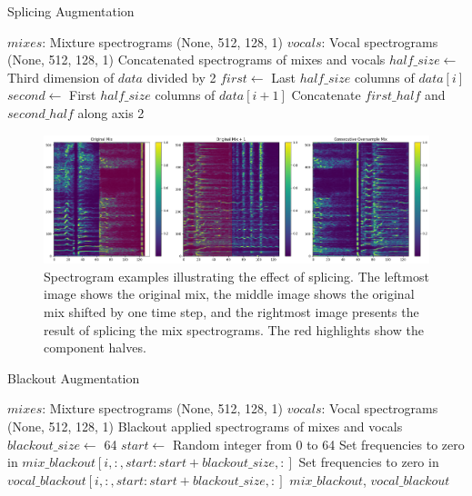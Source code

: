 \documentclass[conference]{IEEEtran}
\begin{document}
\begin{algorithm}[!htb]
\caption{Splicing Augmentation}
\label{alg:splicing}
\begin{algorithmic}[1] %
\Require $mixes$:  Mixture spectrograms (None, 512, 128, 1)
\Require $vocals$: Vocal spectrograms (None, 512, 128, 1)
\Ensure Concatenated spectrograms of mixes and vocals
\newline
{}
    \State $half\_size \gets$ Third dimension of $data$ divided by 2
        \State $first \gets$ Last $half\_size$ columns of $data[i]$
        \State $second \gets$ First $half\_size$ columns of $data[i+1]$
    \EndFor \Return \newline Concatenate $first\_half$ and $second\_half$ along axis 2
\EndFunction
\newline
\end{algorithmic}
\end{algorithm}

\begin{figure}[!htb]
\centering
\includegraphics[width=\linewidth]{consec_sample_aug.png}
\caption{Spectrogram examples illustrating the effect of splicing. The leftmost image shows the original mix, the middle image shows the original mix shifted by one time step, and the rightmost image presents the result of splicing the mix spectrograms. The red highlights show the component halves.}
\label{fig:splicing}
\end{figure}


\begin{algorithm}[!htb]
\caption{Blackout Augmentation}
\label{alg:blackout}
\begin{algorithmic}[1] %
\Require $mixes$:  Mixture spectrograms (None, 512, 128, 1)
\Require $vocals$: Vocal spectrograms (None, 512, 128, 1)
\Ensure Blackout applied spectrograms of mixes and vocals
\newline
\State $blackout\_size \gets$ 64
    \State $start \gets$ Random integer from 0 to 64
    \State Set frequencies to zero in \newline $mix\_blackout[i, :, start:start + blackout\_size, :]$
    \State Set frequencies to zero in \newline $vocal\_blackout[i, :, start:start + blackout\_size, :]$
\EndFor
\Return $mix\_blackout$, $vocal\_blackout$
\end{algorithmic}
\end{algorithm}
\end{document}

